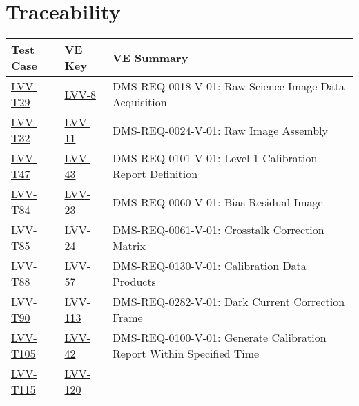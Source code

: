 \section{Traceability}

\begin{longtable}{p{3cm}p{3cm}L{9cm}}
\hline
\textbf{Test Case} & \textbf{VE Key} & \textbf{VE Summary} \\ \hline
\href{https://jira.lsstcorp.org/secure/Tests.jspa#/testCase/LVV-T29}{LVV-T29} &
  \href{https://jira.lsstcorp.org/browse/LVV-8}{LVV-8}
  & DMS-REQ-0018-V-01: Raw Science Image Data Acquisition
 \\ 
\hline
\href{https://jira.lsstcorp.org/secure/Tests.jspa#/testCase/LVV-T32}{LVV-T32} &
  \href{https://jira.lsstcorp.org/browse/LVV-11}{LVV-11}
  & DMS-REQ-0024-V-01: Raw Image Assembly
 \\ 
\hline
\href{https://jira.lsstcorp.org/secure/Tests.jspa#/testCase/LVV-T47}{LVV-T47} &
  \href{https://jira.lsstcorp.org/browse/LVV-43}{LVV-43}
  & DMS-REQ-0101-V-01: Level 1 Calibration Report Definition
 \\ 
\hline
\href{https://jira.lsstcorp.org/secure/Tests.jspa#/testCase/LVV-T84}{LVV-T84} &
  \href{https://jira.lsstcorp.org/browse/LVV-23}{LVV-23}
  & DMS-REQ-0060-V-01: Bias Residual Image
 \\ 
\hline
\href{https://jira.lsstcorp.org/secure/Tests.jspa#/testCase/LVV-T85}{LVV-T85} &
  \href{https://jira.lsstcorp.org/browse/LVV-24}{LVV-24}
  & DMS-REQ-0061-V-01: Crosstalk Correction Matrix
 \\ 
\hline
\href{https://jira.lsstcorp.org/secure/Tests.jspa#/testCase/LVV-T88}{LVV-T88} &
  \href{https://jira.lsstcorp.org/browse/LVV-57}{LVV-57}
  & DMS-REQ-0130-V-01: Calibration Data Products
 \\ 
\hline
\href{https://jira.lsstcorp.org/secure/Tests.jspa#/testCase/LVV-T90}{LVV-T90} &
  \href{https://jira.lsstcorp.org/browse/LVV-113}{LVV-113}
  & DMS-REQ-0282-V-01: Dark Current Correction Frame
 \\ 
\hline
\href{https://jira.lsstcorp.org/secure/Tests.jspa#/testCase/LVV-T105}{LVV-T105} &
  \href{https://jira.lsstcorp.org/browse/LVV-42}{LVV-42}
  & DMS-REQ-0100-V-01: Generate Calibration Report Within Specified Time
 \\ 
\hline
\href{https://jira.lsstcorp.org/secure/Tests.jspa#/testCase/LVV-T115}{LVV-T115} &
  \href{https://jira.lsstcorp.org/browse/LVV-120}{LVV-120}

\end{longtable}
